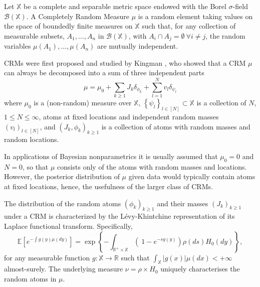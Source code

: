 \begin{definition} \label{def:CRM}
Let $\mathbb{X}$ be a complete and separable metric space endowed with the Borel $\sigma$-field $\mathcal{B}(\mathbb{X})$. A Completely Random Measure $\mu$ is a random element taking values on the space of boundedly finite measures on $\mathbb{X}$ such that, for any collection of measurable subsets, $A_1, \dots , A_n$ in $\mathcal{B}(\mathbb{X})$, with $A_i \cap  A_j = \emptyset \ \forall i \neq j$, the random variables $\mu(A_1), \dots, \mu(A_n)$ are mutually independent.
\end{definition}

\glspl{CRM} were first proposed and studied by Kingman \cite{Kingman:1967kn}, who showed that a \gls{CRM} $\mu$ can always be decomposed into a sum of three independent parts
$$ \mu = \mu_0 + \sum_{k \ge 1}{J_k \delta_{\phi_k}} + \sum_{l=1}^N{v_l \delta_{\psi_l}} $$
where $\mu_0$ is a (non-random) measure over $\mathbb{X}$, $\left\{ \psi_l \right\}_{l \in [N]} \subset  \mathbb{X}$ is a collection of $N$, $1 \le N \le \infty$, atoms at fixed locations and independent random masses $\left(v_l \right)_{l \in [N]}$, and $\left(J_k, \phi_k \right)_{k \ge 1}$ is a collection of atoms with random masses and random locations.

In applications of Bayesian nonparametrics it is usually assumed that $\mu_0 = 0$ and $N = 0$, so that $\mu$ consists only of the atoms with random masses and locations. However, the posterior distribution of $\mu$ given data would typically contain atoms at fixed locations, hence, the usefulness of the larger class of \glspl{CRM}.

The distribution of the random atoms $\left(\phi_k \right)_{k \ge 1}$ and their masses $\left(J_k \right)_{k \ge 1}$ under a \gls{CRM} is characterized by the Lévy-Khintchine representation of its Laplace functional transform. Specifically,
\begin{equation} \label{eq:levy}
\mathbb{E} \left[e^{-\int g(y)\mu(dy)} \right] = \exp \left\{ - \int_{\mathbb{R}^+ \times \mathbb{X}} \left( \  1 - e^{-sg(y)} \right) \rho(ds) H_0(dy) \right\},
\end{equation}
for any measurable function $g: \mathbb{X} \rightarrow \mathbb{R}$ such that $\int_{\mathbb{X}}|g(x)|\mu(dx)<+ \infty$ almost-surely.
The underlying measure $\nu = \rho \times H_0$ uniquely characterises the random atoms in $\mu$.

